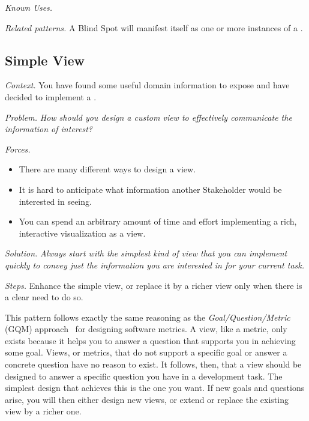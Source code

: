 \documentclass[acmsmall,screen,authorversion,nonacm]{acmart} %
\newcommand\cp[1]{\nbe{Cesare}{#1}{olive}} %
\newcommand\ws[1]{\nbe{Workshop}{#1}{teal}} %
\newcommand{\pattern}[2]{\needlines{10}
\subsection*{#1}\label{pat:#2}}
\newcommand{\patref}[1]{\emph{\nameref{pat:#1}}\xspace}
\newcommand{\patsec}[1]{\noindent\textit{#1.}\xspace}
\begin{document}
\patsec{Known Uses}

\patsec{Related patterns}
A Blind Spot will manifest itself as one or more instances of a \patref{MoldableObject}.

\pattern{Simple View}{SimpleView}


\patsec{Context}
You have found some useful domain information to expose and have decided to implement a \patref{CustomView}.

\patsec{Problem}
\emph{How should you design a custom view to effectively communicate the information of interest?}

\patsec{Forces}
\begin{itemize}[---]
\item There are many different ways to design a view.
\item It is hard to anticipate what information another Stakeholder would be interested in seeing.
\item You can spend an arbitrary amount of time and effort implementing a rich, interactive visualization as a view.
\end{itemize}

\patsec{Solution}
\emph{Always start with the simplest kind of view that you can implement quickly to convey just the information you are interested in for your current task.}

\patsec{Steps}
Enhance the simple view, or replace it by a richer view only when there is a clear need to do so.

This pattern follows exactly the same reasoning as the \emph{Goal/Question/Metric} (GQM) approach~\cite{Basi94a} for designing software metrics.
A view, like a metric, only exists because it helps you to answer a question that supports you in achieving some goal.
Views, or metrics, that do not support a specific goal or answer a concrete question have no reason to exist.
It follows, then, that a view should be designed to answer a specific question you have in a development task.
The simplest design that achieves this is the one you want.
If new goals and questions arise, you will then either design new views, or extend or replace the existing view by a richer one.
\end{document}
